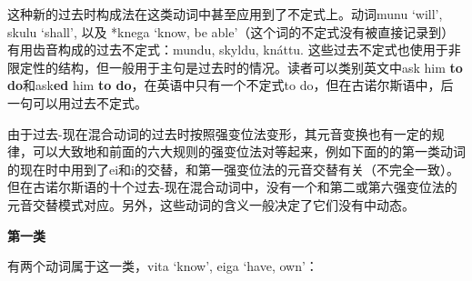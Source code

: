 这种新的过去时构成法在这类动词中甚至应用到了不定式上。动词munu `will‌',
skulu `shall‌', 以及 *knega `know, be
able‌'（这个词的不定式没有被直接记录到）有用齿音构成的过去不定式：mundu,
skyldu, knáttu.
这些过去不定式也使用于非限定性的结构，但一般用于主句是过去时的情况。读者可以类别英文中ask
him \textbf{to do}和ask\textbf{ed} him \textbf{to
  do}，在英语中只有一个不定式to
do，但在古诺尔斯语中，后一句可以用过去不定式。

由于过去-现在混合动词的过去时按照强变位法变形，其元音变换也有一定的规律，可以大致地和前面的六大规则的强变位法对等起来，例如下面的的第一类动词的现在时中用到了ei和i的交替，和第一强变位法的元音交替有关（不完全一致）。但在古诺尔斯语的十个过去-现在混合动词中，没有一个和第二或第六强变位法的元音交替模式对应。另外，这些动词的含义一般决定了它们没有中动态。

\textbf{第一类}

有两个动词属于这一类，vita `know‌', eiga `have, own‌'：


